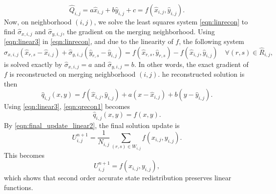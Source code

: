 \begin{equation}\label{eqn:linear3}
\widehat{Q}_{i,j} =  a \widehat{x}_{i,j} + b\widehat{y}_{i,j} + c = f(\widehat{x}_{i,j},\widehat{y}_{i,j}).
\end{equation}
Now, on neighborhood $(i,j)$, we solve the least squares system 
\eqref{eqn:linrecon} to find $\widehat{\sigma}_{x,i,j}$ and
$\widehat{\sigma}_{y,i,j}$, the gradient on the merging neighborhood.  Using
\eqref{eqn:linear3} in \eqref{eqn:linrecon}, and due to the linearity of $f$, the following system
\begin{equation}
\widehat{\sigma}_{x,i,j}(\widehat{x}_{r,s} - \widehat{x}_{i,j}) + \widehat{\sigma}_{y,i,j}(\widehat{y}_{r,s} - \widehat{y}_{i,j})= f(\widehat{x}_{r,s}, \widehat{y}_{r,s}) - f(\widehat{x}_{i,j}, \widehat{y}_{i,j}) \quad \forall (r,s) \in \widehat{R}_{i,j},
\end{equation}
is solved exactly by $\widehat{\sigma}_{x,i,j}=a$ and
$\widehat{\sigma}_{y,i,j}=b$.  In other words, the exact gradient 
of $f$ is reconstructed on merging neighborhood $(i,j)$.  
he reconstructed solution is then
\begin{equation}
    \label{eqn:qrecon1}
    \hat{q}_{i,j}(x,y) = f(\widehat{x}_{i,j},\widehat{y}_{i,j}) + a(x-\widehat{x}_{i,j})+b(y-\widehat{y}_{i,j}) .
\end{equation}
Using \eqref{eqn:linear3}, \eqref{eqn:qrecon1} becomes
\begin{equation}
    \label{eqn:qrecon2}
    \hat{q}_{i,j}(x,y) = f(x,y).
\end{equation}
By \eqref{eqn:final_update_linear2}, the final solution update is
\begin{equation} 
U^{n+1}_{i,j} = \frac{1}{N_{i,j}}\sum_{(r,s) \in W_{i,j}}f(x_{i,j},y_{i,j}).
\end{equation}
This becomes
\begin{equation} 
U^{n+1}_{i,j} = f(x_{i,j},y_{i,j}),
\end{equation}
which shows that second order accurate state redistribution preserves linear functions.



